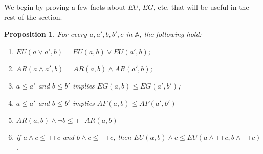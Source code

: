 \documentclass[11pt]{article}
\newcommand{\A}{{\mathbb A}}
\newtheorem{proposition}[definition]{Proposition}
\begin{document}
We begin by proving a few facts about $EU$, $EG$, etc. that will be useful in the rest of the section.
\begin{proposition}\label{basic_prop_EU}
    For every $a,a',b,b',c$ in $\A$, the following hold:
    \begin{enumerate}
        \item $EU(a\vee a',b)=EU(a,b)\vee EU(a',b)$;
        \item $AR(a\wedge a',b)=AR(a,b)\wedge AR(a',b)$;
        \item $a\leq a'$ and $b\leq b'$ implies $EG(a,b)\leq EG(a',b')$;
        \item $a\leq a'$ and $b\leq b'$ implies $AF(a,b)\leq AF(a',b')$
        \item $AR(a,b)\wedge \neg b \leq \Box AR(a,b) $
        \item if $a\wedge c\leq\Box c $ and $b\wedge c\leq\Box c$, then $EU(a,b)\wedge c\leq EU(a\wedge\Box c,b\wedge\Box c)$.
    \end{enumerate}
\end{proposition}
\end{document}
